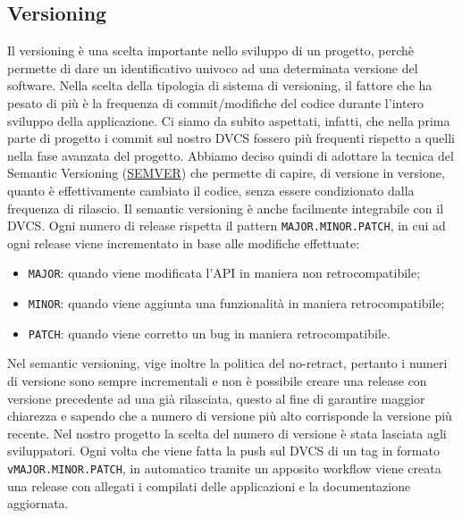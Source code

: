 \subsection{Versioning}
Il versioning è una scelta importante nello sviluppo di un progetto, perchè permette di dare un identificativo univoco ad una determinata versione del software.
\newline \newline Nella scelta della tipologia di sistema di versioning, il fattore che ha pesato di più è la frequenza di commit/modifiche del codice durante l'intero sviluppo della applicazione. Ci siamo da subito aspettati, infatti, che nella prima parte di progetto i commit sul nostro DVCS fossero più frequenti rispetto a quelli nella fase avanzata del progetto.
\newline \newline Abbiamo deciso quindi di adottare la tecnica del Semantic Versioning (\href{https://semver.org/lang/it/}{SEMVER}) che permette di capire, di versione in versione, quanto è effettivamente cambiato il codice, senza essere condizionato dalla frequenza di rilascio. 
Il semantic versioning è anche facilmente integrabile con il DVCS. \newline \newline Ogni numero di release rispetta il pattern \texttt{MAJOR.MINOR.PATCH}, in cui ad ogni release viene incrementato in base alle modifiche effettuate:
\begin{itemize}
    \item \texttt{MAJOR}: quando viene modificata l'API in maniera non retrocompatibile;
    \item \texttt{MINOR}: quando viene aggiunta una funzionalità in maniera retrocompatibile;
    \item \texttt{PATCH}: quando viene corretto un bug in maniera retrocompatibile.
\end{itemize}

Nel semantic versioning, vige inoltre la politica del no-retract, pertanto i numeri di versione sono sempre incrementali e non è possibile creare una release con versione precedente ad una già rilasciata, questo al fine di garantire maggior chiarezza e sapendo che a numero di versione più alto corrisponde la versione più recente.
\newline
\newline
Nel nostro progetto la scelta del numero di versione è stata lasciata agli sviluppatori. Ogni volta che viene fatta la push sul DVCS di un tag in formato \texttt{vMAJOR.MINOR.PATCH}, in automatico tramite un apposito workflow viene creata una release con allegati i compilati delle applicazioni e la documentazione aggiornata.

